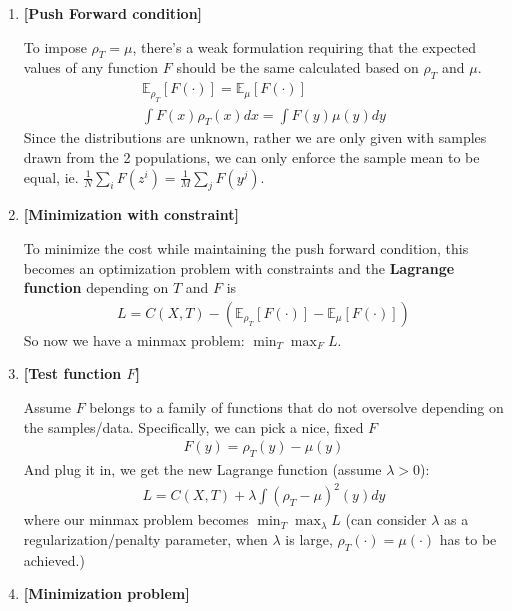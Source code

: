 \documentclass[11pt]{article}
\begin{document}
\begin{enumerate}
    \item {\bf [Push Forward condition]}
    
    To impose $\rho_T=\mu$, there's a weak formulation requiring that the expected values of any function $F$ should be the same calculated based on $\rho_T$ and $\mu$.
    \begin{align*}
        \mathbb{E}_{\rho_{T}} [F(\cdot)] = \mathbb{E}_{\mu} [F(\cdot)]\\
        \int F(x) \rho_T(x) dx = \int F(y) \mu(y) dy
    \end{align*}
    Since the distributions are unknown, rather we are only given with samples drawn from the 2 populations, we can only enforce the sample mean to be equal, ie. $\frac{1}{N} \sum_i F(z^i) = \frac{1}{M} \sum_j F(y^j)$.
    
    \item {\bf [Minimization with constraint]}
    
    To minimize the cost while maintaining the push forward condition, this becomes an optimization problem with constraints and the {\bf Lagrange function} depending on $T$ and $F$ is 
    \begin{align}
        L = C(X,T) - (\mathbb{E}_{\rho_{T}} [F(\cdot)] - \mathbb{E}_{\mu} [F(\cdot)])
    \end{align}
    So now we have a minmax problem: $\min_T \max_F L$.
    
    \item {\bf [Test function $F$]}
    
    Assume $F$ belongs to a family of functions that do not oversolve depending on the samples/data. Specifically, we can pick a nice, fixed $F$
    \begin{align}
        F(y) = \rho_T(y) - \mu(y)
    \end{align}
    And plug it in, we get the new Lagrange function (assume $\lambda>0$):
    \begin{align*}
        L = C(X,T) + \lambda \int (\rho_T - \mu)^2(y) dy
    \end{align*}
    where our minmax problem becomes $\min_T \max_\lambda L$ (can consider $\lambda$ as a regularization/penalty parameter, when $\lambda$ is large, $\rho_T(\cdot) = \mu(\cdot)$ has to be achieved.)
    
    \item {\bf [Minimization problem]}
    

\end{enumerate}
\end{document}
